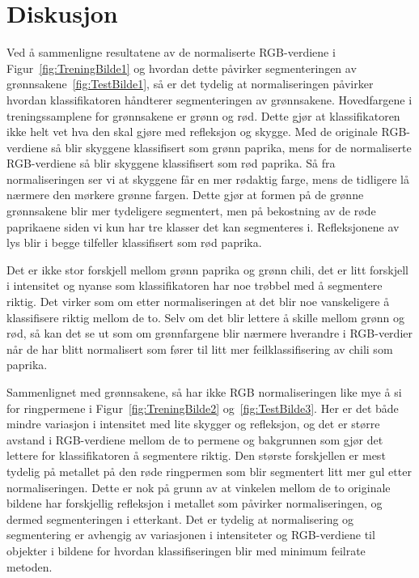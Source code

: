 \documentclass[twocolumn,norwegian]{article}
\begin{document}
	\section{Diskusjon}
	Ved å sammenligne resultatene av de normaliserte RGB-verdiene i Figur~\ref{fig:TreningBilde1} og hvordan dette påvirker segmenteringen av grønnsakene~\ref{fig:TestBilde1}, så er det tydelig at normaliseringen påvirker hvordan klassifikatoren håndterer segmenteringen av grønnsakene. Hovedfargene i treningssamplene for grønnsakene er grønn og rød. Dette gjør at klassifikatoren ikke helt vet hva den skal gjøre med refleksjon og skygge. Med de originale RGB-verdiene så blir skyggene klassifisert som grønn paprika, mens for de normaliserte RGB-verdiene så blir skyggene klassifisert som rød paprika. Så fra normaliseringen ser vi at skyggene får en mer rødaktig farge, mens de tidligere lå nærmere den mørkere grønne fargen. Dette gjør at formen på de grønne grønnsakene blir mer tydeligere segmentert, men på bekostning av de røde paprikaene siden vi kun har tre klasser det kan segmenteres i. Refleksjonene av lys blir i begge tilfeller klassifisert som rød paprika.
	
	Det er ikke stor forskjell mellom grønn paprika og grønn chili, det er litt forskjell i intensitet og nyanse som klassifikatoren har noe trøbbel med å segmentere riktig. Det virker som om etter normaliseringen at det blir noe vanskeligere å klassifisere riktig mellom de to. Selv om det blir lettere å skille mellom grønn og rød, så kan det se ut som om grønnfargene blir nærmere hverandre i RGB-verdier når de har blitt normalisert som fører til litt mer feilklassifisering av chili som paprika.

	Sammenlignet med grønnsakene, så har ikke RGB normaliseringen like mye å si for ringpermene i Figur~\ref{fig:TreningBilde2} og~\ref{fig:TestBilde3}. Her er det både mindre variasjon i intensitet med lite skygger og refleksjon, og det er større avstand i RGB-verdiene mellom de to permene og bakgrunnen som gjør det lettere for klassifikatoren å segmentere riktig. Den største forskjellen er mest tydelig på metallet på den røde ringpermen som blir segmentert litt mer gul etter normaliseringen. Dette er nok på grunn av at vinkelen mellom de to originale bildene har forskjellig refleksjon i metallet som påvirker normaliseringen, og dermed segmenteringen i etterkant. Det er tydelig at normalisering og segmentering er avhengig av variasjonen i intensiteter og RGB-verdiene til objekter i bildene for hvordan klassifiseringen blir med minimum feilrate metoden.
\end{document}
